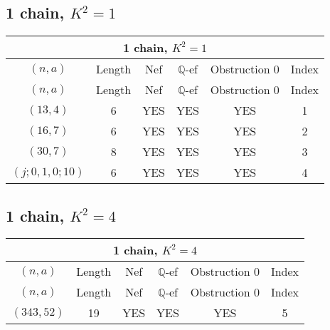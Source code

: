 \subsection{1 chain, $K^2 = 1$}
\begin{longtable}{|c|c|c|c|c|c|}
\hline
\multicolumn{6}{|c|}{1 chain, $K^2 = 1$}\\
\hline
$(n,a)$ & Length & Nef & $\mathbb Q$-ef & Obstruction 0 & Index\\
\hline
\endfirsthead

\hline
$(n,a)$ & Length & Nef & $\mathbb Q$-ef & Obstruction 0 & Index\\
\hline
\endhead
\hline
\endfoot

$(13, 4)$ & 6 & YES & YES & YES & 1\\
$(16, 7)$ & 6 & YES & YES & YES & 2\\
$(30, 7)$ & 8 & YES & YES & YES & 3\\
$(j; 0, 1, 0; 10)$ & 6 & YES & YES & YES & 4
\end{longtable}
\subsection{1 chain, $K^2 = 4$}
\begin{longtable}{|c|c|c|c|c|c|}
\hline
\multicolumn{6}{|c|}{1 chain, $K^2 = 4$}\\
\hline
$(n,a)$ & Length & Nef & $\mathbb Q$-ef & Obstruction 0 & Index\\
\hline
\endfirsthead

\hline
$(n,a)$ & Length & Nef & $\mathbb Q$-ef & Obstruction 0 & Index\\
\hline
\endhead
\hline
\endfoot

$(343, 52)$ & 19 & YES & YES & YES & 5
\end{longtable}
